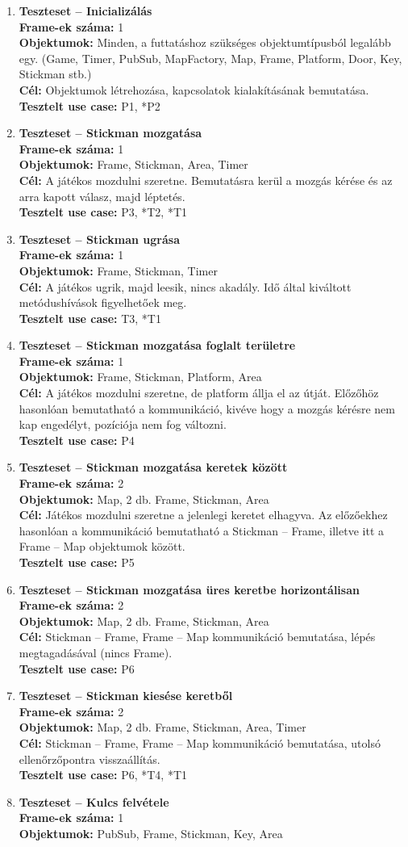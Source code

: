 		\begin{enumerate}[label=\textbf{\arabic*.}, start=0]
		
			\newcommand{\testitem}[1]{\item \textbf{Teszteset -- #1}\\}
			\newcommand{\tframe}[1]{\textbf{Frame-ek száma:} #1\\}
			\newcommand{\tobjekt}[1]{\textbf{Objektumok:} #1\\}
			\newcommand{\tcel}[1]{\textbf{Cél:} #1\\}
			\newcommand{\tuse}[1]{\textbf{Tesztelt use case:} #1\\}
		
			\testitem{Inicializálás}
				\tframe{1}
				\tobjekt{Minden, a futtatáshoz szükséges objektumtípusból legalább egy.
					(Game, Timer, PubSub, MapFactory, Map, Frame, Platform, Door, Key, Stickman stb.)}
				\tcel{Objektumok létrehozása, kapcsolatok kialakításának bemutatása.}
				\tuse{P1, *P2}
			\testitem{Stickman mozgatása}
				\tframe{1}
				\tobjekt{Frame, Stickman, Area, Timer}
				\tcel{A játékos mozdulni szeretne. Bemutatásra kerül a mozgás kérése és az arra kapott válasz, majd léptetés.} 
				\tuse{P3, *T2, *T1}
			\testitem{Stickman ugrása}
				\tframe{1}
				\tobjekt{Frame, Stickman, Timer}
				\tcel{A játékos ugrik, majd leesik, nincs akadály. Idő által kiváltott metódushívások figyelhetőek meg.} 
				\tuse{T3, *T1}
			\testitem{Stickman mozgatása foglalt területre}
				\tframe{1}
				\tobjekt{Frame, Stickman, Platform, Area}
				\tcel{A játékos mozdulni szeretne, de platform állja el az útját. Előzőhöz hasonlóan bemutatható a kommunikáció, kivéve hogy a mozgás kérésre nem kap engedélyt, pozíciója nem fog változni.}
				\tuse{P4}
			\testitem{Stickman mozgatása keretek között}
				\tframe{2}
				\tobjekt{Map, 2 db. Frame, Stickman, Area}
				\tcel{Játékos mozdulni szeretne a jelenlegi keretet elhagyva. Az előzőekhez hasonlóan a kommunikáció bemutatható a Stickman -- Frame, illetve itt a Frame -- Map objektumok között.}
				\tuse{P5}
			\testitem{Stickman mozgatása üres keretbe horizontálisan}
				\tframe{2}
				\tobjekt{Map, 2 db. Frame, Stickman, Area}
				\tcel{Stickman -- Frame, Frame -- Map kommunikáció bemutatása, lépés megtagadásával (nincs Frame).}
				\tuse{P6}
			\testitem{Stickman kiesése keretből}
				\tframe{2}
				\tobjekt{Map, 2 db. Frame, Stickman, Area, Timer}
				\tcel{Stickman -- Frame, Frame -- Map kommunikáció bemutatása, utolsó ellenőrzőpontra visszaállítás.}
				\tuse{P6, *T4, *T1}
			\testitem{Kulcs felvétele}
				\tframe{1}
				\tobjekt{PubSub, Frame, Stickman, Key, Area}

\end{enumerate}

